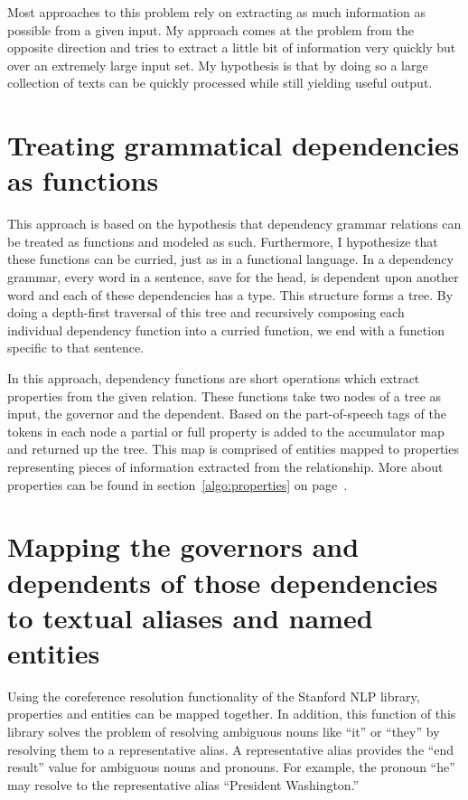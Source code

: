 Most approaches to this problem rely on extracting as much information as possible from a given input.  My approach comes at the problem from the opposite direction and tries to extract a little bit of information very quickly but over an extremely large input set.  My hypothesis is that by doing so a large collection of texts can be quickly processed while still yielding useful output.

\section{Treating grammatical dependencies as functions}

This approach is based on the hypothesis that dependency grammar relations can be treated as functions and modeled as such.  Furthermore, I hypothesize that these functions can be curried, just as in a functional language.  In a dependency grammar, every word in a sentence, save for the head, is dependent upon another word and each of these dependencies has a type.  This structure forms a tree.  By doing a depth-first traversal of this tree and recursively composing each individual dependency function into a curried function, we end with a function specific to that sentence.

In this approach, dependency functions are short operations which extract properties from the given relation.  These functions take two nodes of a tree as input, the governor and the dependent.  Based on the part-of-speech tags of the tokens in each node a partial or full property is added to the accumulator map and returned up the tree.  This map is comprised of entities mapped to properties representing pieces of information extracted from the relationship.  More about properties can be found in section~\ref{algo:properties} on page~\pageref{algo:properties}.




\section{Mapping the governors and dependents of those dependencies to textual aliases and named entities}

Using the coreference resolution functionality of the Stanford NLP library, properties and entities can be mapped together.  In addition, this function of this library solves the problem of resolving ambiguous nouns like ``it'' or ``they'' by resolving them to a representative alias.  A representative alias provides the ``end result'' value for ambiguous nouns and pronouns.  For example, the pronoun ``he'' may resolve to the representative alias ``President Washington.''


